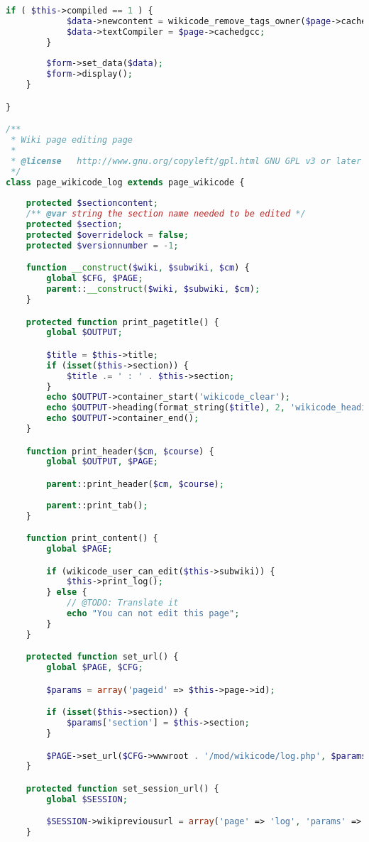 \begin{lstlisting}[language=PHP]
		if ( $this->compiled == 1 ) {
			$data->newcontent = wikicode_remove_tags_owner($page->cachedcompile);
			$data->textCompiler = $page->cachedgcc;
		}
		
        $form->set_data($data);
        $form->display();
    }

}

/**
 * Wiki page editing page
 *
 * @license   http://www.gnu.org/copyleft/gpl.html GNU GPL v3 or later
 */
class page_wikicode_log extends page_wikicode {
	
	protected $sectioncontent;
    /** @var string the section name needed to be edited */
    protected $section;
    protected $overridelock = false;
    protected $versionnumber = -1;

    function __construct($wiki, $subwiki, $cm) {
        global $CFG, $PAGE;
        parent::__construct($wiki, $subwiki, $cm);
    }

    protected function print_pagetitle() {
        global $OUTPUT;

        $title = $this->title;
        if (isset($this->section)) {
            $title .= ' : ' . $this->section;
        }
        echo $OUTPUT->container_start('wikicode_clear');
        echo $OUTPUT->heading(format_string($title), 2, 'wikicode_headingtitle');
        echo $OUTPUT->container_end();
    }

    function print_header($cm, $course) {
        global $OUTPUT, $PAGE;

        parent::print_header($cm, $course);
		
		parent::print_tab();
    }

    function print_content() {
        global $PAGE;

        if (wikicode_user_can_edit($this->subwiki)) {
            $this->print_log();
        } else {
            // @TODO: Translate it
            echo "You can not edit this page";
        }
    }

    protected function set_url() {
        global $PAGE, $CFG;

        $params = array('pageid' => $this->page->id);

        if (isset($this->section)) {
            $params['section'] = $this->section;
        }

        $PAGE->set_url($CFG->wwwroot . '/mod/wikicode/log.php', $params);
    }

    protected function set_session_url() {
        global $SESSION;

        $SESSION->wikipreviousurl = array('page' => 'log', 'params' => array('pageid' => $this->page->id, 'section' => $this->section));
    }


\end{lstlisting}
